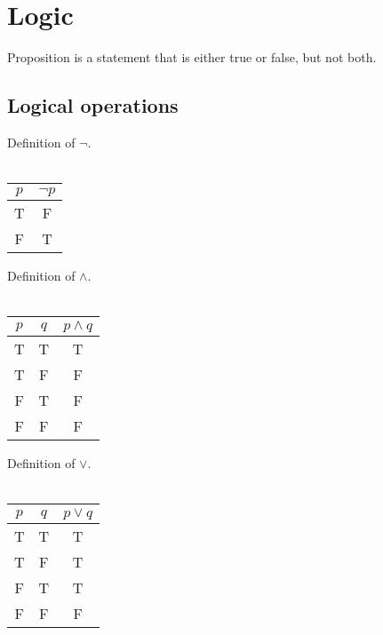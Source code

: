 \chapter{Logic}
\begin{defn}
Proposition is a statement that is either true or false, but not both.
\end{defn}

\section{Logical operations}

\begin{defn}
Definition of $\lnot$. \\ \\
\begin{tabular}{|c|c|}
\hline
$p$ & $\lnot p$  \\
\hline
T & F \\
\hline
F & T \\
\hline
\end{tabular}
\end{defn}

\begin{defn}
Definition of $\land$. \\ \\
\begin{tabular}{|c|c|c|}
\hline
$p$ & $q$ & $p \land q$ \\
\hline
T & T & T \\
\hline
T & F & F \\
\hline
F & T & F \\
\hline
F & F & F \\
\hline
\end{tabular}
\end{defn}

\begin{defn}
Definition of $\lor$. \\ \\
\begin{tabular}{|c|c|c|}
\hline
$p$ & $q$ & $p \lor q$ \\
\hline
T & T & T \\
\hline
T & F & T \\
\hline
F & T & T \\
\hline
F & F & F \\
\hline
\end{tabular}
\end{defn}

